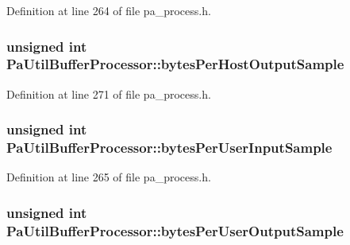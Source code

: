 Definition at line 264 of file pa\+\_\+process.\+h.

\subsubsection[{\texorpdfstring{bytes\+Per\+Host\+Output\+Sample}{bytesPerHostOutputSample}}]{\setlength{\rightskip}{0pt plus 5cm}unsigned {\bf int} Pa\+Util\+Buffer\+Processor\+::bytes\+Per\+Host\+Output\+Sample}\hypertarget{struct_pa_util_buffer_processor_a8a796dfdfac7c79bfffe8a44e690b358}{}\label{struct_pa_util_buffer_processor_a8a796dfdfac7c79bfffe8a44e690b358}


Definition at line 271 of file pa\+\_\+process.\+h.

\subsubsection[{\texorpdfstring{bytes\+Per\+User\+Input\+Sample}{bytesPerUserInputSample}}]{\setlength{\rightskip}{0pt plus 5cm}unsigned {\bf int} Pa\+Util\+Buffer\+Processor\+::bytes\+Per\+User\+Input\+Sample}\hypertarget{struct_pa_util_buffer_processor_aaa4aba8c617b56f63f165e35b28fe393}{}\label{struct_pa_util_buffer_processor_aaa4aba8c617b56f63f165e35b28fe393}


Definition at line 265 of file pa\+\_\+process.\+h.

\subsubsection[{\texorpdfstring{bytes\+Per\+User\+Output\+Sample}{bytesPerUserOutputSample}}]{\setlength{\rightskip}{0pt plus 5cm}unsigned {\bf int} Pa\+Util\+Buffer\+Processor\+::bytes\+Per\+User\+Output\+Sample}\hypertarget{struct_pa_util_buffer_processor_aa390974cb52943cf40efed34c1daf52b}{}\label{struct_pa_util_buffer_processor_aa390974cb52943cf40efed34c1daf52b}



